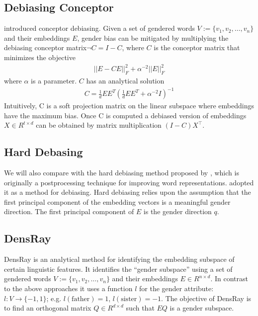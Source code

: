 \subsection{Debiasing Conceptor}
 introduced conceptor debiasing. Given a set of gendered words $V:=\{v_1,v_2,\dots,v_n\}$ and their embeddings $E$, gender bias can be mitigated by multiplying the debiasing conceptor matrix$\neg C= I-C$, where $C$ is the conceptor matrix that minimizes the objective
\begin{eqnarray}
||E-CE||^2_F+\alpha^{-2}||E||^2_F
\end{eqnarray}
where $\alpha$ is a parameter. $C$ has an analytical solution
\begin{eqnarray}
C=\frac{1}{d}EE^{T}(\frac{1}{d}EE^{T}+\alpha^{-2}I)^{-1}
\end{eqnarray}
Intuitively, C is a soft projection matrix on the linear subspace where embeddings have the maximum bias. 
Once C is computed a debiased version of embeddings $X \in R^{t \times d}$  can be obtained by matrix multiplication $(I-C)X^\intercal$.

\subsection{Hard Debasing}
We will also compare with the hard debiasing method proposed
by , which is originally a postprocessing
technique for improving word
representations.  adopted it as a
method for debiasing. Hard debiasing relies upon
the assumption that the first principal component of the
embedding vectors is a meaningful gender direction. The first principal component of $E$ is the gender direction $q$.

\subsection{DensRay}
DensRay \cite{dufter2019analytical} is an analytical method for identifying the
embedding subspace of certain linguistic features. It
identifies the ``gender subspace'' using a set of gendered words
$V:=\{v_1,v_2,\dots,v_n\}$ and their embeddings $E \in
R^{n\times d}$. In contrast to the above approaches it uses a function $l$ for the gender attribute:
$l:V\to \{-1,1\}$;
e.g. $l(\mbox{father})=1$, $l(\mbox{sister})=-1$. The objective of DensRay
is to find an orthogonal matrix $Q\in R^{d\times d}$ such
that $EQ$ is  a gender subspace.

